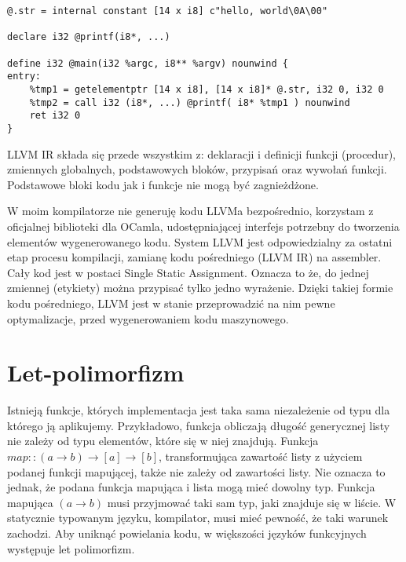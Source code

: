 \documentclass[declaration,shortabstract]{iithesis}
\begin{document}
\begin{lstlisting}[frame=lines]
@.str = internal constant [14 x i8] c"hello, world\0A\00"

declare i32 @printf(i8*, ...)

define i32 @main(i32 %argc, i8** %argv) nounwind {
entry:
    %tmp1 = getelementptr [14 x i8], [14 x i8]* @.str, i32 0, i32 0
    %tmp2 = call i32 (i8*, ...) @printf( i8* %tmp1 ) nounwind
    ret i32 0
}
\end{lstlisting}

LLVM IR składa się przede wszystkim z: deklaracji i definicji funkcji
(procedur), zmiennych globalnych, podstawowych bloków, przypisań oraz 
wywołań funkcji. Podstawowe bloki kodu jak i funkcje nie 
mogą być zagnieżdżone. 

W moim kompilatorze nie generuję kodu LLVMa bezpośrednio, 
korzystam z oficjalnej biblioteki dla OCamla, 
udostępniającej interfejs potrzebny do tworzenia elementów wygenerowanego kodu. 
System LLVM 
jest odpowiedzialny za ostatni etap procesu kompilacji, zamianę kodu 
pośredniego (LLVM IR) 
na assembler. Cały kod jest w postaci Single Static Assignment. Oznacza to że, 
do jednej zmiennej (etykiety) można przypisać tylko jedno wyrażenie. 
Dzięki takiej formie kodu pośredniego, LLVM jest w 
stanie przeprowadzić na nim pewne optymalizacje, przed wygenerowaniem kodu 
maszynowego. 



\section{Let-polimorfizm}

Istnieją funkcje, których implementacja jest taka sama niezależenie od typu dla
którego ją aplikujemy. Przykładowo, funkcja obliczają długość generycznej 
listy nie zależy od typu elementów, które się w niej znajdują. 
Funkcja $map :: (a \rightarrow b) \rightarrow [a] \rightarrow [b]$, 
transformująca zawartość listy 
z użyciem podanej funkcji mapującej, także nie zależy od zawartości listy. Nie 
oznacza to jednak, że podana funkcja mapująca i lista mogą mieć dowolny typ. 
Funkcja mapująca $(a \rightarrow b)$ musi przyjmować taki sam typ, jaki 
znajduje się w liście. W statycznie typowanym języku, kompilator, musi mieć 
pewność, że taki warunek zachodzi. Aby uniknąć powielania kodu, w większości 
języków funkcyjnych 
występuje let polimorfizm. 
\end{document}
